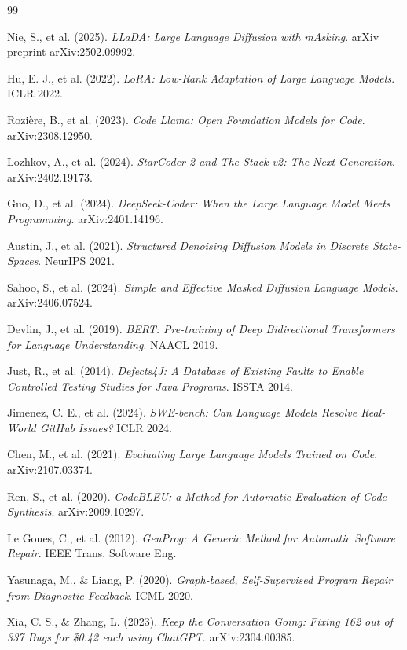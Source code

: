 \documentclass[11pt,a4paper]{article}
\begin{document}
\begin{thebibliography}{99}

Nie, S., et al. (2025).
\textit{LLaDA: Large Language Diffusion with mAsking}.
arXiv preprint arXiv:2502.09992.

Hu, E. J., et al. (2022).
\textit{LoRA: Low-Rank Adaptation of Large Language Models}.
ICLR 2022.

Rozière, B., et al. (2023).
\textit{Code Llama: Open Foundation Models for Code}.
arXiv:2308.12950.

Lozhkov, A., et al. (2024).
\textit{StarCoder 2 and The Stack v2: The Next Generation}.
arXiv:2402.19173.

Guo, D., et al. (2024).
\textit{DeepSeek-Coder: When the Large Language Model Meets Programming}.
arXiv:2401.14196.

Austin, J., et al. (2021).
\textit{Structured Denoising Diffusion Models in Discrete State-Spaces}.
NeurIPS 2021.

Sahoo, S., et al. (2024).
\textit{Simple and Effective Masked Diffusion Language Models}.
arXiv:2406.07524.

Devlin, J., et al. (2019).
\textit{BERT: Pre-training of Deep Bidirectional Transformers for Language Understanding}.
NAACL 2019.

Just, R., et al. (2014).
\textit{Defects4J: A Database of Existing Faults to Enable Controlled Testing Studies for Java Programs}.
ISSTA 2014.

Jimenez, C. E., et al. (2024).
\textit{SWE-bench: Can Language Models Resolve Real-World GitHub Issues?}
ICLR 2024.

Chen, M., et al. (2021).
\textit{Evaluating Large Language Models Trained on Code}.
arXiv:2107.03374.

Ren, S., et al. (2020).
\textit{CodeBLEU: a Method for Automatic Evaluation of Code Synthesis}.
arXiv:2009.10297.

Le Goues, C., et al. (2012).
\textit{GenProg: A Generic Method for Automatic Software Repair}.
IEEE Trans. Software Eng.

Yasunaga, M., \& Liang, P. (2020).
\textit{Graph-based, Self-Supervised Program Repair from Diagnostic Feedback}.
ICML 2020.

Xia, C. S., \& Zhang, L. (2023).
\textit{Keep the Conversation Going: Fixing 162 out of 337 Bugs for \$0.42 each using ChatGPT}.
arXiv:2304.00385.

\end{thebibliography}
\end{document}

